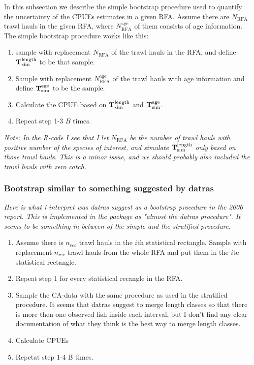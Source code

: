 \documentclass[a4paper 12pt]{article}
\numberwithin{equation}{section}
\begin{document}
In this subsection we describe the simple bootstrap procedure used to quantify the uncertainty of the CPUEs estimates in a given RFA. Assume there are $N_{\text{RFA}}$ trawl hauls in the given RFA, where $N_{\text{RFA}}^{\text{age}}$ of them consists of age information. The simple bootstrap procedure works like this:


\begin{enumerate}
\item sample with replacement $N_{\text{RFA}}$ of the trawl hauls in the RFA, and define ${\bf T}_{\text{sim}}^{\text{length}}$ to be that sample.
\item Sample with replacement $N_{\text{RFA}}^{\text{age}}$ of the trawl hauls with age information and define ${\bf T}_{\text{sim}}^{\text{age}}$ to be the sample.
\item Calculate the CPUE based on ${\bf T }_{\text{sim}}^{\text{length}}$ and ${\bf T}_{\text{sim}}^{\text{age}}$. 
\item Repeat step 1-3 $B$ times.
\end{enumerate}  

\textit{Note: In the R-code I see that I let $N_{\text{RFA}}$ be the number of trawl hauls with positive number of the species of interest, and simulate ${\bf T}_{\text{sim}}^{\text{length}}$ only based on those trawl hauls. This is a minor issue, and we should probably also included the trawl hauls with zero catch.}


\subsubsection{Bootstrap similar to something suggested by datras} 


 
\label{datrasboot} 

\emph{Here is what i interpret was datras suggest as a bootstrap procedure in the 2006 report. This is implemented in the package as "almost the datras procedure". It seems to be something in between of the simple and the stratified procedure. } 

 \begin{enumerate} 
\item  Assume there is $n_{rec}$ trawl hauls in the $i$th statistical rectangle. Sample with replacement $n_{rec}$ trawl hauls from the whole RFA and put them in the $i$te statistical rectangle. 
\item Repeat step 1 for every statistical recangle in the RFA. 
\item Sample the CA-data with the same procedure as used in the stratified procedure. It seems that datras suggest to merge length classes so that there is more then one observed fish inside each interval, but I don't find any clear documentation of what they think is the best way to merge length classes.   
\item Calculate CPUEs 
\item Repetat step 1-4 B times. 
 \end{enumerate} 
 
\end{document}
